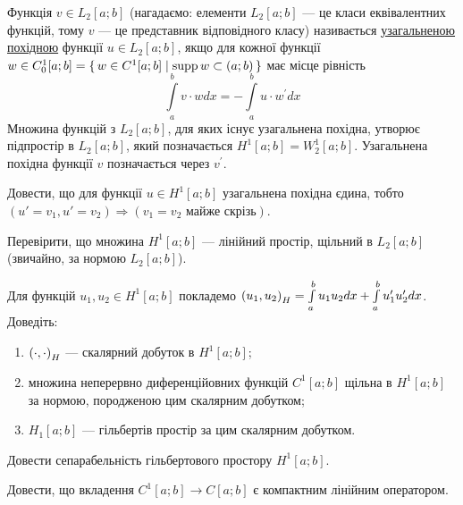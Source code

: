 
\begin{theory}
    Функція $v \in L_2[a;b]$ (нагадаємо: елементи
    $L_2[a;b]$ --- це класи еквівалентних функцій, тому
    $v$ --- це представник відповідного класу) називається
    \uline{узагальненою похідною} функції $u \in L_2[a;b]$,
    якщо для кожної функції $w \in C_0^1 [a;b] = \set{w \in C^1[a;b] \mid \operatorname{supp}{w} \subset (a; b)}$
    має місце рівність $$\int\limits_a^b v \cdot w dx = -\int\limits_a^b u \cdot w^\prime dx$$
    Множина функцій з $L_2[a;b]$, для яких існує узагальнена похідна, утворює
    підпростір в $L_2[a;b]$, який позначається $H^1[a;b] = W_2^1[a;b]$.
    Узагальнена похідна функції $v$ позначається через $v^\prime$.
\end{theory}

\begin{exercise}
    Довести, що для функції $u \in H^1[a;b]$ узагальнена похідна єдина,
    тобто $(u' = v_1, u' = v_2) \Rightarrow (v_1 = v_2 \text{ майже скрізь})$.
\end{exercise}

\begin{exercise}
    Перевірити, що множина $H^1[a;b]$ --- лінійний простір, щільний в $L_2[a;b]$ (звичайно, за нормою $L_2[a;b]$).
\end{exercise}

\begin{exercise}
    Для функцій $u_1, u_2 \in H^1[a;b]$ покладемо
    $\left(u_1, u_2\right)_H = \int\limits_a^b u_1 u_2 dx +\int\limits_a^b u_1^{\prime} u_2^{\prime} dx$.
    Доведіть:
    \begin{enumerate}
        \item $\left(\cdot, \cdot\right)_H$ --- скалярний добуток в $H^1[a;b]$;
        \item множина неперервно диференційовних функцій $C^1[a;b]$ щільна в $H^1[a;b]$ за нормою, породженою цим скалярним добутком;
        \item $H_1[a;b]$ --- гільбертів простір за цим скалярним добутком.
    \end{enumerate}
\end{exercise}

\begin{exercise}
    Довести сепарабельність гільбертового простору $H^1[a;b]$.
\end{exercise}

\begin{exercise}
    Довести, що вкладення $C^1[a;b] \to C[a;b]$ є компактним лінійним оператором.
\end{exercise}

